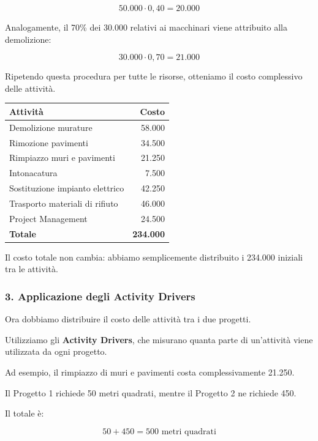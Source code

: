 \[
50.000\cdot0{,}40=\boxed{20.000}
\]

\noindent Analogamente, il 70\%
dei 30.000 relativi ai macchinari
viene attribuito alla demolizione:

\[
30.000\cdot0{,}70=\boxed{21.000}
\]

\noindent Ripetendo questa procedura
per tutte le risorse, otteniamo
il costo complessivo delle attività.

\begin{center}
\begin{tabular}{|l|r|}
\hline
\textbf{Attività} & \textbf{Costo} \\
\hline
Demolizione murature & 58.000 \\
\hline
Rimozione pavimenti & 34.500 \\
\hline
Rimpiazzo muri e pavimenti & 21.250 \\
\hline
Intonacatura & 7.500 \\
\hline
Sostituzione impianto elettrico & 42.250 \\
\hline
Trasporto materiali di rifiuto & 46.000 \\
\hline
Project Management & 24.500 \\
\hline
\textbf{Totale} & \textbf{234.000} \\
\hline
\end{tabular}
\end{center}

\noindent Il costo totale non cambia:
abbiamo semplicemente distribuito
i 234.000 iniziali tra le attività.

\subsubsection*{3. Applicazione degli Activity Drivers}

\noindent Ora dobbiamo distribuire
il costo delle attività tra i due progetti.

\noindent Utilizziamo gli \textbf{Activity Drivers},
che misurano quanta parte di un'attività
viene utilizzata da ogni progetto.

\medskip

\noindent Ad esempio, il rimpiazzo di muri
e pavimenti costa complessivamente 21.250.

\noindent Il Progetto 1 richiede 50 metri quadrati,
mentre il Progetto 2 ne richiede 450.

\noindent Il totale è:

\[
50+450=500\text{ metri quadrati}
\]

